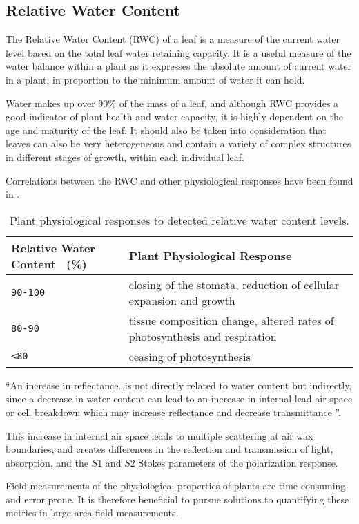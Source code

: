 \subsection{Relative Water Content}
The Relative Water Content (RWC) of a leaf is a measure of the current water level based on the total leaf water retaining capacity.  It is a useful measure of the water balance within a plant as it expresses the absolute amount of current water in a plant, in proportion to the minimum amount of water it can hold.

Water makes up over 90\% of the mass of a leaf, and although RWC provides a good indicator of plant health and water capacity, it is highly dependent on the age and maturity of the leaf.  It should also be taken into consideration that leaves can also be very heterogeneous and contain a variety of complex structures in different stages of growth, within each individual leaf.

Correlations between the RWC and other physiological responses have been found in \cite{ecophysiology}.

\begin{table}[h]
  \centering
  \begin{tabular}{ll}
    \toprule
    \textbf{Relative Water Content ~(\%)}      & \textbf{Plant Physiological Response}\\
    \midrule
      \texttt{90-100}          & closing of the stomata, reduction of cellular expansion and growth\\
      \texttt{80-90}           & tissue composition change, altered rates of photosynthesis and respiration\\
      \texttt{<80}         & ceasing of photosynthesis\\
    \bottomrule
  \end{tabular}
  \caption{%
    Plant physiological responses to detected relative water content levels.
  }
  \label{tab:Packages}
\end{table}

“An increase in reflectance…is not directly related to water content but indirectly, since a decrease in water content can lead to an increase in internal lead air space or cell breakdown which may increase reflectance and decrease transmittance \cite{photonvegetation}”.

This increase in internal air space leads to multiple scattering at air wax boundaries, and creates differences in the reflection and transmission of light, absorption, and the $S1$ and $S2$ Stokes parameters of the polarization response.

Field measurements of the physiological properties of plants are time consuming and error prone.  It is therefore beneficial to pursue solutions to quantifying these metrics in large area field measurements.
